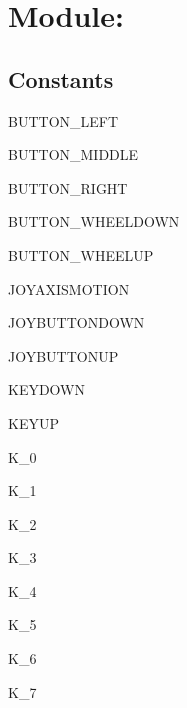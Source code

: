 \section{Module: }
\subsection{Constants}
\begin{datadesc}{BUTTON_LEFT}
\end{datadesc}
\begin{datadesc}{BUTTON_MIDDLE}
\end{datadesc}
\begin{datadesc}{BUTTON_RIGHT}
\end{datadesc}
\begin{datadesc}{BUTTON_WHEELDOWN}
\end{datadesc}
\begin{datadesc}{BUTTON_WHEELUP}
\end{datadesc}
\begin{datadesc}{JOYAXISMOTION}
\end{datadesc}
\begin{datadesc}{JOYBUTTONDOWN}
\end{datadesc}
\begin{datadesc}{JOYBUTTONUP}
\end{datadesc}
\begin{datadesc}{KEYDOWN}
\end{datadesc}
\begin{datadesc}{KEYUP}
\end{datadesc}
\begin{datadesc}{K_0}
\end{datadesc}
\begin{datadesc}{K_1}
\end{datadesc}
\begin{datadesc}{K_2}
\end{datadesc}
\begin{datadesc}{K_3}
\end{datadesc}
\begin{datadesc}{K_4}
\end{datadesc}
\begin{datadesc}{K_5}
\end{datadesc}
\begin{datadesc}{K_6}
\end{datadesc}
\begin{datadesc}{K_7}
\end{datadesc}

